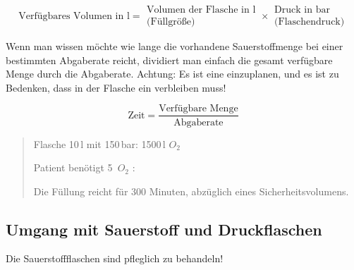 \begin{equation}
\mbox{Verfügbares Volumen in l} = {\begin{array}{c}
\mbox{Volumen der Flasche in l}\\
\mbox{(Füllgröße)} \end{array}}
\times 
\begin{array}{c}{\mbox{Druck in bar}}\\
\mbox{(Flaschendruck)}
\end{array}
\end{equation}




Wenn man wissen m\"ochte wie lange die vorhandene Sauerstoffmenge bei
einer bestimmten Abgaberate reicht, dividiert man einfach
die gesamt verfügbare Menge durch die Abgaberate. Achtung:
Es ist eine  einzuplanen, und es
ist zu Bedenken, dass in der Flasche ein 
verbleiben muss!

\begin{equation}
\mbox{Zeit} = \frac{\mbox{Verfügbare
Menge}}{\mbox{Abgaberate}}
\end{equation}





\begin{quotation}
Flasche 10\,l mit 150\,bar: 1500\,l  $O_2$

Patient ben\"otigt 5\, $O_2$ : 

Die Füllung reicht für 300 Minuten, abzüglich eines
Sicherheitsvolumens.
\end{quotation}

\subsection{Umgang mit Sauerstoff und Druckflaschen}

Die Sauerstoffflaschen sind pfleglich zu behandeln!



